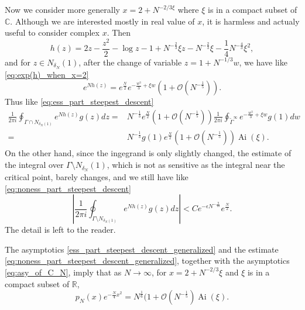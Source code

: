 \documentclass[11pt, a4paper]{article}
\numberwithin{equation}{section}
\newcommand{\bigO}{\mathcal{O}}
\newcommand{\compC}{\mathbb{C}}
\newcommand{\realR}{\mathbb{R}}
\DeclareMathOperator{\Ai}{Ai}
\theoremstyle{definition}
\theoremstyle{remark}
\begin{document}
Now we consider more generally $x = 2 + N^{-2/3 \xi}$ where $\xi$ is in a compact subset of $\compC$. Although we are interested mostly in real value of $x$, it is harmless and actualy useful to consider complex $x$. Then
\begin{equation}
  h(z) = 2z - \frac{z^2}{2} - \log z - 1 + N^{-\frac{2}{3}} \xi z - N^{-\frac{2}{3}} \xi - \frac{1}{4} N^{-\frac{4}{3}} \xi^2,
\end{equation}
and for $z \in N_{\delta_N}(1)$, after the change of variable $z = 1 + N^{-1/3}w$, we have like \eqref{eq:exp(h)_when_x=2}
\begin{equation}
  e^{N h(z)} = e^{\frac{N}{2}} e^{-\frac{w^3}{3} + \xi w} (1 + \bigO(N^{-\frac{1}{5}})).
\end{equation}
Thus like \eqref{eq:ess_part_steepest_descent}
\begin{equation} \label{ess_part_steepest_descent_generalized}
  \begin{split}
    \frac{1}{2\pi i} \oint_{\Gamma \cap N_{\delta_N(1)}} e^{Nh(z)} g(z) dz = {}& N^{-\frac{1}{3}}  e^{\frac{N}{2}} (1 + \bigO(N^{-\frac{1}{5}})) \frac{1}{2\pi i} \oint_{\tilde{\Gamma}^{\infty}} e^{-\frac{w^3}{3} + \xi w} g(1) dw \\
    = {}& N^{-\frac{1}{3}} g(1) e^{\frac{N}{2}} (1 + \bigO(N^{-\frac{1}{5}})) \Ai(\xi).
  \end{split}
\end{equation}
On the other hand, since the ingegrand is only slightly changed, the estimate of the integral over $\Gamma \setminus N_{\delta_N}(1)$, which is not as sensitive as the integral near the critical point, barely changes, and we still have like \eqref{eq:noness_part_steepest_descent}
\begin{equation} \label{eq:noness_part_steepest_descent_generalized}
  \left\lvert \frac{1}{2\pi i} \oint_{\Gamma \setminus N_{\delta_N(1)}} e^{Nh(z)} g(z) dz \right\rvert < C e^{- \epsilon N^{-\frac{9}{10}}} e^{\frac{N}{2}}.
\end{equation}
The detail is left to the reader. 

The asymptotics \eqref{ess_part_steepest_descent_generalized} and the estimate \eqref{eq:noness_part_steepest_descent_generalized}, together with the asymptotics \eqref{eq:asy_of_C_N}, imply that as $N \to \infty$, for $x = 2 + N^{-2/3}\xi$ and $\xi$ is in a compact subset of $\realR$,
\begin{equation} \label{eq:asy_of_p_N}
  p_N(x) e^{-\frac{N}{4}x^2} = N^{\frac{1}{6}} (1 + \bigO(N^{-\frac{1}{5}}) \Ai(\xi).
\end{equation}
\end{document}
